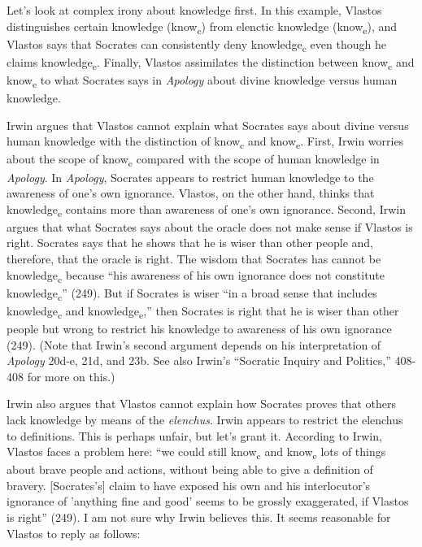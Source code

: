 \documentclass[12pt,letterpaper]{article}
\begin{document}
Let's look at complex irony about knowledge first.
In this example, Vlastos distinguishes certain knowledge (know\textsubscript{c}) from elenctic knowledge (know\textsubscript{e}), and Vlastos says that Socrates can consistently deny knowledge\textsubscript{c} even though he claims knowledge\textsubscript{e}.
Finally, Vlastos assimilates the distinction between know\textsubscript{c} and know\textsubscript{e} to what Socrates says in \textit{Apology} about divine knowledge versus human knowledge.

Irwin argues that Vlastos cannot explain what Socrates says about divine versus human knowledge with the distinction of know\textsubscript{c} and know\textsubscript{e}.
First, Irwin worries about the scope of know\textsubscript{e} compared with the scope of human knowledge in \textit{Apology}.
In \textit{Apology}, Socrates appears to restrict human knowledge to the awareness of one's own ignorance.
Vlastos, on the other hand, thinks that knowledge\textsubscript{e} contains more than awareness of one's own ignorance.
Second, Irwin argues that what Socrates says about the oracle does not make sense if Vlastos is right.
Socrates says that he shows that he is wiser than other people and, therefore, that the oracle is right.
The wisdom that Socrates has cannot be knowledge\textsubscript{c} because ``his awareness of his own ignorance does not constitute knowledge\textsubscript{c}'' (249).
But if Socrates is wiser ``in a broad sense that includes knowledge\textsubscript{c} and knowledge\textsubscript{e},'' then Socrates is right that he is wiser than other people but wrong to restrict his knowledge to awareness of his own ignorance (249).
(Note that Irwin's second argument depends on his interpretation of \textit{Apology} 20d-e, 21d, and 23b.
See also Irwin's ``Socratic Inquiry and Politics,'' 408-408 for more on this.)

Irwin also argues that Vlastos cannot explain how Socrates proves that others lack knowledge by means of the \textit{elenchus}.
Irwin appears to restrict the elenchus to definitions.
This is perhaps unfair, but let's grant it.
According to Irwin, Vlastos faces a problem here:
``we could still know\textsubscript{c} and know\textsubscript{e} lots of things about brave people and actions, without being able to give a definition of bravery.
[Socrates's] claim to have exposed his own and his interlocutor's ignorance of 'anything fine and good' seems to be grossly exaggerated, if Vlastos is right'' (249).
I am not sure why Irwin believes this.
It seems reasonable for Vlastos to reply as follows:
\end{document}
